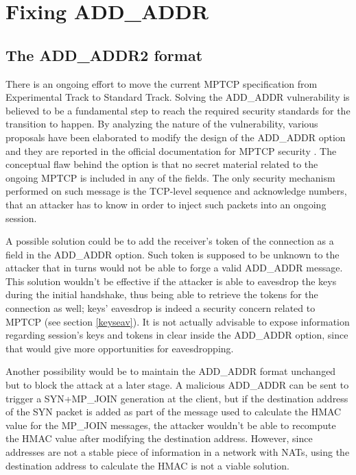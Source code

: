 \chapter{Fixing ADD\_ADDR}
\label{chap:addaddr2}

\section{The ADD\_ADDR2 format}
There is an ongoing effort to move the current MPTCP specification from Experimental Track to Standard Track. Solving the ADD\_ADDR vulnerability is believed to be a fundamental step to reach the required security standards for the transition to happen.
By analyzing the nature of the vulnerability, various proposals have been elaborated to modify the design of the ADD\_ADDR option and they are reported in the official documentation for MPTCP security \cite{rfc7430}. The conceptual flaw behind the option is that no secret material related to the ongoing MPTCP is included in any of the fields. The only security mechanism performed on such message is the TCP-level sequence and acknowledge numbers, that an attacker has to know in order to inject such packets into an ongoing session.

A possible solution could be to add the receiver's token of the connection as a field in the ADD\_ADDR option. Such token is supposed to be unknown to the attacker that in turns would not be able to forge a valid ADD\_ADDR message. This solution wouldn't be effective if the attacker is able to eavesdrop the keys during the initial handshake, thus being able to retrieve the tokens for the connection as well; keys' eavesdrop is indeed a security concern related to MPTCP (see section \ref{keyseav}). It is not actually advisable to expose information regarding session's keys and tokens in clear inside the ADD\_ADDR option, since that would give more opportunities for eavesdropping.

Another possibility would be to maintain the ADD\_ADDR format unchanged but to block the attack at a later stage. A malicious ADD\_ADDR can be sent to trigger a SYN+MP\_JOIN generation at the client, but if the destination address of the SYN packet is added as part of the message used to calculate the HMAC value  for the MP\_JOIN messages, the attacker wouldn't be able to recompute the HMAC value after modifying the destination address. However, since addresses are not a stable piece of information in a network with NATs, using the destination address to calculate the HMAC is not a viable solution.

